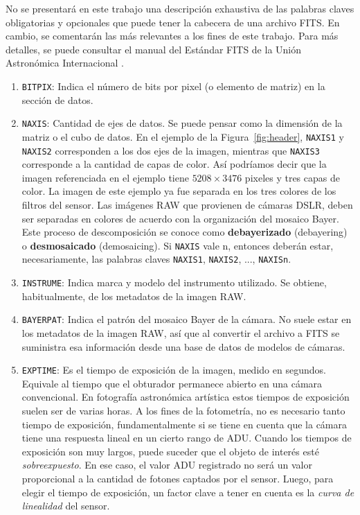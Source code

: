 \documentclass[a4paper, 12pt]{article}
\begin{document}
No se presentará en este trabajo una descripción exhaustiva de las palabras claves obligatorias y opcionales que puede tener la cabecera de una archivo FITS. En cambio, se comentarán las más relevantes a los fines de este trabajo. Para más detalles, se puede consultar el manual del Estándar FITS de la Unión Astronómica Internacional \cite{fits}.

\begin{enumerate}
\item {\tt BITPIX}: Indica el número de bits por pixel (o elemento de matriz) en la sección de datos.
\item {\tt NAXIS}: Cantidad de ejes de datos. Se puede pensar como la dimensión de la matriz o el cubo de datos. En el ejemplo de la Figura~\ref{fig:header}, {\tt NAXIS1} y {\tt NAXIS2} corresponden a los dos ejes de la imagen, mientras que {\tt NAXIS3} corresponde a la cantidad de capas de color. Así podríamos decir que la imagen referenciada en el ejemplo tiene $5208 \times 3476$ pixeles y tres capas de color. La imagen de este ejemplo ya fue separada en los tres colores de los filtros del sensor. Las imágenes RAW que provienen de cámaras DSLR, deben ser separadas en colores de acuerdo con la organización del mosaico Bayer. Este proceso de descomposición se conoce como {\bf debayerizado} (debayering) o {\bf desmosaicado} (demosaicing). Si {\tt NAXIS} vale n, entonces deberán estar, necesariamente, las palabras claves {\tt NAXIS1}, {\tt NAXIS2}, ..., {\tt NAXISn}.
\item {\tt INSTRUME}: Indica marca y modelo del instrumento utilizado. Se obtiene, habitualmente, de los metadatos de la imagen RAW.
\item {\tt BAYERPAT}: Indica el patrón del mosaico Bayer de la cámara. No suele estar en los metadatos de la imagen RAW, así que al convertir el archivo a FITS se suministra esa información desde una base de datos de modelos de cámaras.
\item {\tt EXPTIME}: Es el tiempo de exposición de la imagen, medido en segundos. Equivale al tiempo que el obturador permanece abierto en una cámara convencional. En fotografía astronómica artística estos tiempos de exposición suelen ser de varias horas. A los fines de la fotometría, no es necesario tanto tiempo de exposición, fundamentalmente si se tiene en cuenta que la cámara tiene una respuesta lineal en un cierto rango de ADU. Cuando los tiempos de exposición son muy largos, puede suceder que el objeto de interés esté {\it sobreexpuesto}. En ese caso, el valor ADU registrado no será un valor proporcional a la cantidad de fotones captados por el sensor. Luego, para elegir el tiempo de exposición, un factor clave a tener en cuenta es la {\it curva de linealidad} del sensor.

\end{enumerate}
\end{document}
